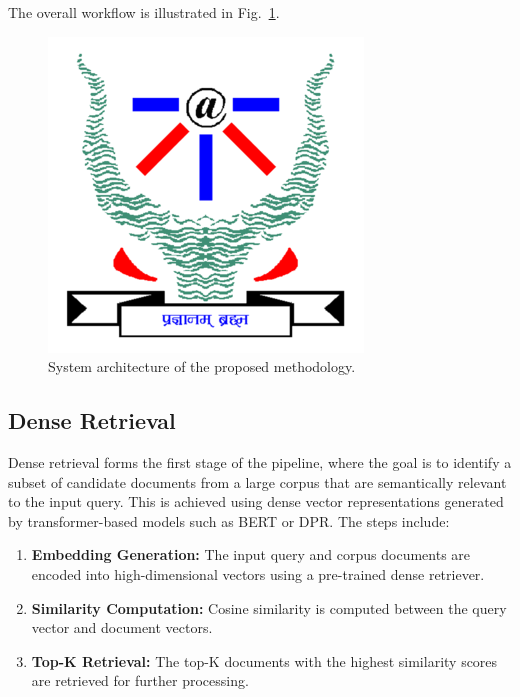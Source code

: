 The overall workflow is illustrated in Fig.~\ref{fig:system_architecture}.

\begin{figure}[ht]
    \centering
    \includegraphics[width=\linewidth]{IMAGE/IIITAlogo.png} %
    \caption{System architecture of the proposed methodology.}
    \label{fig:system_architecture}
\end{figure}

\subsection{Dense Retrieval}
Dense retrieval forms the first stage of the pipeline, where the goal is to identify a subset of candidate documents from a large corpus that are semantically relevant to the input query. This is achieved using dense vector representations generated by transformer-based models such as BERT or DPR. The steps include:
\begin{enumerate}
    \item \textbf{Embedding Generation:} The input query and corpus documents are encoded into high-dimensional vectors using a pre-trained dense retriever.
    \item \textbf{Similarity Computation:} Cosine similarity is computed between the query vector and document vectors.
    \item \textbf{Top-K Retrieval:} The top-K documents with the highest similarity scores are retrieved for further processing.
\end{enumerate}

